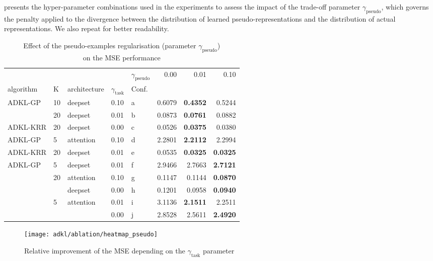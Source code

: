  presents the hyper-parameter combinations used in the experiments to assess the impact of the trade-off parameter $\gamma_\mathrm{pseudo}$, which governs the penalty applied to the divergence between the distribution of learned pseudo-representations and the distribution of actual representations. We also repeat  for better readability.

\begin{table}[ht]
    \caption{Effect of the pseudo-examples regularisation (parameter $\gamma_\mathrm{pseudo}$)\\on the MSE performance}
    \centering
    \begin{tabular}{@{}lllllrrr@{}}
        \toprule
                   &    &                  &      & $\gamma_\mathrm{pseudo}$ &    0.00 &    0.01 &    0.10 \\
        algorithm & K & architecture & $\gamma_\mathrm{task}$ & Conf. &         &         &         \\
        \midrule
        ADKL-GP & 10 & deepset & 0.10 & a  &  0.6079 &  \textbf{0.4352} &  0.5244 \\
                   & 20 & deepset & 0.01 & b  &  0.0873 &  \textbf{0.0761} &  0.0882 \\
        ADKL-KRR & 20 & deepset & 0.00 & c  &  0.0526 &  \textbf{0.0375} &  0.0380 \\
        ADKL-GP & 5  & attention & 0.10 & d  &  2.2801 &  \textbf{2.2112} &  2.2994 \\
        ADKL-KRR & 20 & deepset & 0.01 & e  &  0.0535 &  \textbf{0.0325} &  \textbf{0.0325} \\
        ADKL-GP & 5  & deepset & 0.01 & f  &  2.9466 &  2.7663 &  \textbf{2.7121} \\
                   & 20 & attention & 0.10 & g  &  0.1147 &  0.1144 &  \textbf{0.0870} \\
                   &    & deepset & 0.00 & h  &  0.1201 &  0.0958 &  \textbf{0.0940} \\
                   & 5  & attention & 0.01 & i  &  3.1136 &  \textbf{2.1511} &  2.2511 \\
                   &    &                  & 0.00 & j &  2.8528 &  2.5611 &  \textbf{2.4920} \\
        \bottomrule
    \end{tabular}
    \label{tab:app-ablation-pseudo}
\end{table}

\begin{figure}[ht]
    \centering
    \texttt{[image: adkl/ablation/heatmap\_pseudo]}
    \caption{Relative improvement of the MSE depending on the $\gamma_\mathrm{task}$ parameter}
    \label{fig:app-pseudo}
\end{figure}

